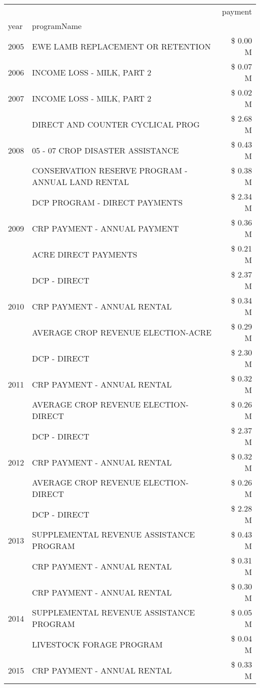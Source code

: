 \begin{tabular}{llr}
\toprule
 &  & payment \\
year & programName &  \\
\midrule
2005 & EWE LAMB REPLACEMENT OR RETENTION & \$ 0.00 M \\
\cline{1-3}
2006 & INCOME LOSS - MILK, PART 2 & \$ 0.07 M \\
\cline{1-3}
2007 & INCOME LOSS - MILK, PART 2 & \$ 0.02 M \\
\cline{1-3}
\multirow[t]{3}{*}{2008} & DIRECT AND COUNTER CYCLICAL PROG & \$ 2.68 M \\
 & 05 - 07 CROP DISASTER ASSISTANCE & \$ 0.43 M \\
 & CONSERVATION RESERVE PROGRAM - ANNUAL LAND RENTAL & \$ 0.38 M \\
\cline{1-3}
\multirow[t]{3}{*}{2009} & DCP PROGRAM - DIRECT PAYMENTS & \$ 2.34 M \\
 & CRP PAYMENT - ANNUAL PAYMENT & \$ 0.36 M \\
 & ACRE DIRECT PAYMENTS & \$ 0.21 M \\
\cline{1-3}
\multirow[t]{3}{*}{2010} & DCP - DIRECT & \$ 2.37 M \\
 & CRP PAYMENT - ANNUAL RENTAL & \$ 0.34 M \\
 & AVERAGE CROP REVENUE ELECTION-ACRE & \$ 0.29 M \\
\cline{1-3}
\multirow[t]{3}{*}{2011} & DCP - DIRECT & \$ 2.30 M \\
 & CRP PAYMENT - ANNUAL RENTAL & \$ 0.32 M \\
 & AVERAGE CROP REVENUE ELECTION-DIRECT & \$ 0.26 M \\
\cline{1-3}
\multirow[t]{3}{*}{2012} & DCP - DIRECT & \$ 2.37 M \\
 & CRP PAYMENT - ANNUAL RENTAL & \$ 0.32 M \\
 & AVERAGE CROP REVENUE ELECTION-DIRECT & \$ 0.26 M \\
\cline{1-3}
\multirow[t]{3}{*}{2013} & DCP - DIRECT & \$ 2.28 M \\
 & SUPPLEMENTAL REVENUE ASSISTANCE PROGRAM & \$ 0.43 M \\
 & CRP PAYMENT - ANNUAL RENTAL & \$ 0.31 M \\
\cline{1-3}
\multirow[t]{3}{*}{2014} & CRP PAYMENT - ANNUAL RENTAL & \$ 0.30 M \\
 & SUPPLEMENTAL REVENUE ASSISTANCE PROGRAM & \$ 0.05 M \\
 & LIVESTOCK FORAGE PROGRAM & \$ 0.04 M \\
\cline{1-3}
\multirow[t]{3}{*}{2015} & CRP PAYMENT - ANNUAL RENTAL & \$ 0.33 M \\

\end{tabular}
